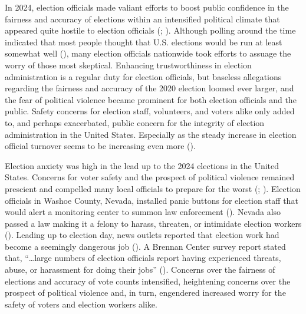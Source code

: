 \documentclass[
  11pt,
  a4paper,
]{scrartcl}
\begin{document}
In 2024, election officials made valiant efforts to boost public
confidence in the fairness and accuracy of elections within an
intensified political climate that appeared quite hostile to election
officials (; ).
Although polling around the time indicated that most people thought that
U.S. elections would be run at least somewhat well
(), many election officials
nationwide took efforts to assuage the worry of those most skeptical.
Enhancing trustworthiness in election administration is a regular duty
for election officials, but baseless allegations regarding the fairness
and accuracy of the 2020 election loomed ever larger, and the fear of
political violence became prominent for both election officials and the
public. Safety concerns for election staff, volunteers, and voters alike
only added to, and perhaps exacerbated, public concern for the integrity
of election administration in the United States. Especially as the
steady increase in election official turnover seems to be increasing
even more ().

Election anxiety was high in the lead up to the 2024 elections in the
United States. Concerns for voter safety and the prospect of political
violence remained prescient and compelled many local officials to
prepare for the worst (;
). Election officials in
Washoe County, Nevada, installed panic buttons for election staff that
would alert a monitoring center to summon law enforcement
(). Nevada also passed a law
making it a felony to harass, threaten, or intimidate election workers
(). Leading up to election day, news outlets reported that election
work had become a seemingly dangerous job (). A Brennan Center survey report stated that,
``\ldots large numbers of election officials report having experienced
threats, abuse, or harassment for doing their jobs''
(). Concerns over the
fairness of elections and accuracy of vote counts intensified,
heightening concerns over the prospect of political violence and, in
turn, engendered increased worry for the safety of voters and election
workers alike.
\end{document}
